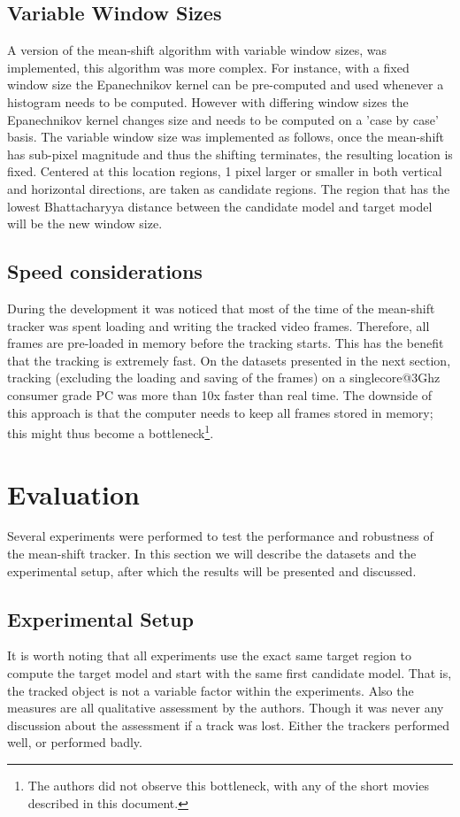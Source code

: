\documentclass[a4paper,11pt]{article}
\begin{document}
\subsection{Variable Window Sizes}
A version of the mean-shift algorithm with variable window sizes, was implemented, this algorithm was more complex. For instance, with a fixed window size the Epanechnikov kernel can be pre-computed and used whenever a histogram needs to be computed. However with differing window sizes the Epanechnikov kernel changes size and needs to be computed on a 'case by case' basis. 
The variable window size was implemented as follows, once the mean-shift has sub-pixel magnitude and thus the shifting terminates, the resulting location is fixed. Centered at this location regions, 1 pixel larger or smaller in both vertical and horizontal directions, are taken as candidate regions. The region that has the lowest Bhattacharyya distance between the candidate model and target model will be the new window size.     
  
\subsection{Speed considerations}
During the development it was noticed that most of the time of the mean-shift tracker was spent loading and writing the tracked video frames. Therefore, all frames are pre-loaded in memory before the tracking starts. This has the benefit that the tracking is extremely fast. On the datasets presented in the next section, tracking (excluding the loading and saving of the frames) on a singlecore@3Ghz consumer grade PC was more than 10x faster than real time. The downside of this approach is that the computer needs to keep all frames stored in memory; this might thus become a bottleneck\footnote{The authors did not observe this bottleneck, with any of the short movies described in this document.}.

\section{Evaluation} 
Several experiments were performed to test the performance and robustness of the mean-shift tracker. In this section we will describe the datasets and the experimental setup, after which the results will be presented and discussed.
 
\subsection{Experimental Setup}
It is worth noting that all experiments use the exact same target region to compute the target model and start with the same first candidate model.  That is, the tracked object is not a variable factor within the experiments. Also the measures are all qualitative assessment by the authors. Though it was never any discussion about the assessment if a track was lost. Either the trackers performed well, or performed badly.
\end{document}

